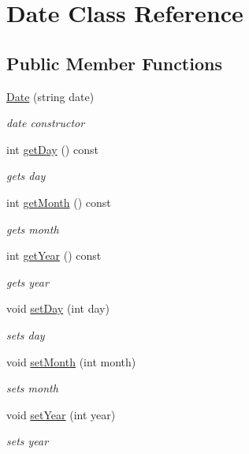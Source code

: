 \hypertarget{class_date}{}\section{Date Class Reference}
\label{class_date}
\subsection*{Public Member Functions}
\begin{DoxyCompactItemize}
\item 
\hyperlink{class_date_a5532efafed41fd5f8e013a61313200dc}{Date} (string date)
\begin{DoxyCompactList}\small\item\em date constructor \end{DoxyCompactList}\item 
int \hyperlink{class_date_a0f253815240e70f4c39cb93cc68bd3f4}{get\+Day} () const
\begin{DoxyCompactList}\small\item\em gets day \end{DoxyCompactList}\item 
int \hyperlink{class_date_a332f6e3a2f6a40d73742b6dab7be0f64}{get\+Month} () const
\begin{DoxyCompactList}\small\item\em gets month \end{DoxyCompactList}\item 
int \hyperlink{class_date_a8b0869f34c2b38d108ab83ee2e770e5d}{get\+Year} () const
\begin{DoxyCompactList}\small\item\em gets year \end{DoxyCompactList}\item 
void \hyperlink{class_date_a2f97b9d1ac5ef0ef6b6cab3335c5303d}{set\+Day} (int day)
\begin{DoxyCompactList}\small\item\em sets day \end{DoxyCompactList}\item 
void \hyperlink{class_date_a23aa56014dd581d691607df5d4474f64}{set\+Month} (int month)
\begin{DoxyCompactList}\small\item\em sets month \end{DoxyCompactList}\item 
void \hyperlink{class_date_a895c4ae9868e43577cf59d9c679d7a71}{set\+Year} (int year)
\begin{DoxyCompactList}\small\item\em sets year \end{DoxyCompactList}\item 

\end{DoxyCompactItemize}
